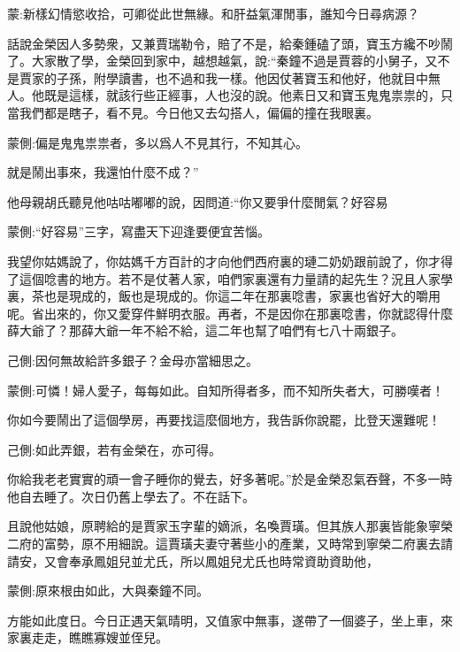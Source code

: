 

\begin{parag}
    \begin{note}蒙:新樣幻情慾收拾，可卿從此世無緣。和肝益氣渾閒事，誰知今日尋病源？\end{note}
\end{parag}


\begin{parag}
    話說金榮因人多勢衆，又兼賈瑞勒令，賠了不是，給秦鍾磕了頭，寶玉方纔不吵鬧了。大家散了學，金榮回到家中，越想越氣，說:“秦鐘不過是賈蓉的小舅子，又不是賈家的子孫，附學讀書，也不過和我一樣。他因仗著寶玉和他好，他就目中無人。他既是這樣，就該行些正經事，人也沒的說。他素日又和寶玉鬼鬼祟祟的，只當我們都是瞎子，看不見。今日他又去勾搭人，偏偏的撞在我眼裏。\begin{note}蒙側:偏是鬼鬼祟祟者，多以爲人不見其行，不知其心。\end{note}就是鬧出事來，我還怕什麼不成？”
\end{parag}


\begin{parag}
    他母親胡氏聽見他咕咕嘟嘟的說，因問道:“你又要爭什麼閒氣？好容易\begin{note}蒙側:“好容易”三字，寫盡天下迎逢要便宜苦惱。\end{note}我望你姑媽說了，你姑媽千方百計的才向他們西府裏的璉二奶奶跟前說了，你才得了這個唸書的地方。若不是仗著人家，咱們家裏還有力量請的起先生？況且人家學裏，茶也是現成的，飯也是現成的。你這二年在那裏唸書，家裏也省好大的嚼用呢。省出來的，你又愛穿件鮮明衣服。再者，不是因你在那裏唸書，你就認得什麼薛大爺了？那薛大爺一年不給不給，這二年也幫了咱們有七八十兩銀子。\begin{note}己側:因何無故給許多銀子？金母亦當細思之。\end{note}\begin{note}蒙側:可憐！婦人愛子，每每如此。自知所得者多，而不知所失者大，可勝嘆者！\end{note}你如今要鬧出了這個學房，再要找這麼個地方，我告訴你說罷，比登天還難呢！\begin{note}己側:如此弄銀，若有金榮在，亦可得。\end{note}你給我老老實實的頑一會子睡你的覺去，好多著呢。”於是金榮忍氣吞聲，不多一時他自去睡了。次日仍舊上學去了。不在話下。
\end{parag}


\begin{parag}
    且說他姑娘，原聘給的是賈家玉字輩的嫡派，名喚賈璜。但其族人那裏皆能象寧榮二府的富勢，原不用細說。這賈璜夫妻守著些小的產業，又時常到寧榮二府裏去請請安，又會奉承鳳姐兒並尤氏，所以鳳姐兒尤氏也時常資助資助他，\begin{note}蒙側:原來根由如此，大與秦鐘不同。\end{note}方能如此度日。今日正遇天氣晴明，又值家中無事，遂帶了一個婆子，坐上車，來家裏走走，瞧瞧寡嫂並侄兒。
\end{parag}


